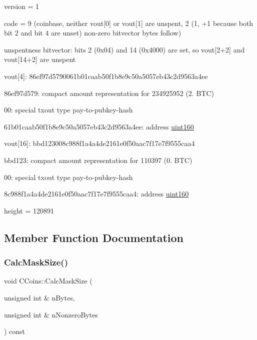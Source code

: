 \begin{DoxyItemize}
\item version = 1
\item code = 9 (coinbase, neither vout\mbox{[}0\mbox{]} or vout\mbox{[}1\mbox{]} are unspent, 2 (1, +1 because both bit 2 and bit 4 are unset) non-\/zero bitvector bytes follow)
\item unspentness bitvector\+: bits 2 (0x04) and 14 (0x4000) are set, so vout\mbox{[}2+2\mbox{]} and vout\mbox{[}14+2\mbox{]} are unspent
\item vout\mbox{[}4\mbox{]}\+: 86ef97d5790061b01caab50f1b8e9c50a5057eb43c2d9563a4ee
\begin{DoxyItemize}
\item 86ef97d579\+: compact amount representation for 234925952 (2. B\+TC)
\item 00\+: special txout type pay-\/to-\/pubkey-\/hash
\item 61b01caab50f1b8e9c50a5057eb43c2d9563a4ee\+: address \mbox{\hyperlink{classuint160}{uint160}}
\end{DoxyItemize}
\item vout\mbox{[}16\mbox{]}\+: bbd123008c988f1a4a4de2161e0f50aac7f17e7f9555caa4
\begin{DoxyItemize}
\item bbd123\+: compact amount representation for 110397 (0. B\+TC)
\item 00\+: special txout type pay-\/to-\/pubkey-\/hash
\item 8c988f1a4a4de2161e0f50aac7f17e7f9555caa4\+: address \mbox{\hyperlink{classuint160}{uint160}}
\end{DoxyItemize}
\item height = 120891 
\end{DoxyItemize}

\subsection{Member Function Documentation}
\mbox{\label{class_c_coins_a7fc7a42f2b5d7cf7476bfe3e10141e18}} 
\subsubsection{\texorpdfstring{CalcMaskSize()}{CalcMaskSize()}}
{\footnotesize\ttfamily void C\+Coins\+::\+Calc\+Mask\+Size (\begin{DoxyParamCaption}\item[{unsigned int \&}]{n\+Bytes,  }\item[{unsigned int \&}]{n\+Nonzero\+Bytes }\end{DoxyParamCaption}) const}

